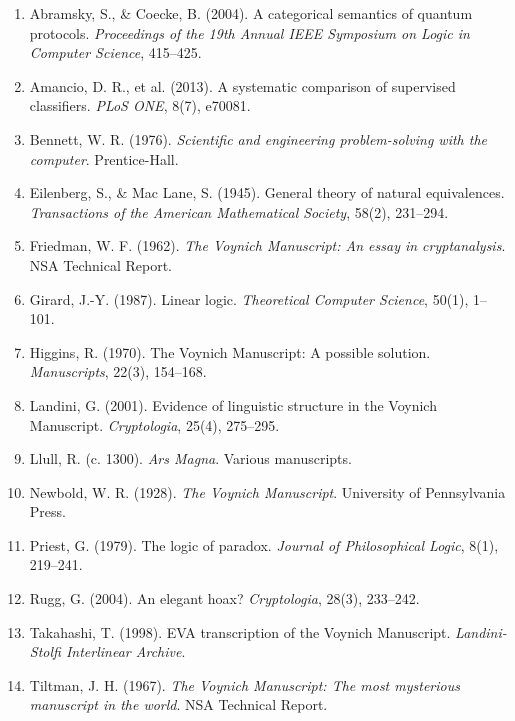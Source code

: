 \documentclass[12pt,a4paper]{article}
\begin{document}
\begin{enumerate}
    \item Abramsky, S., \& Coecke, B. (2004). A categorical semantics of quantum protocols. \emph{Proceedings of the 19th Annual IEEE Symposium on Logic in Computer Science}, 415--425.
    \item Amancio, D. R., et al. (2013). A systematic comparison of supervised classifiers. \emph{PLoS ONE}, 8(7), e70081.
    \item Bennett, W. R. (1976). \emph{Scientific and engineering problem-solving with the computer}. Prentice-Hall.
    \item Eilenberg, S., \& Mac Lane, S. (1945). General theory of natural equivalences. \emph{Transactions of the American Mathematical Society}, 58(2), 231--294.
    \item Friedman, W. F. (1962). \emph{The Voynich Manuscript: An essay in cryptanalysis}. NSA Technical Report.
    \item Girard, J.-Y. (1987). Linear logic. \emph{Theoretical Computer Science}, 50(1), 1--101.
    \item Higgins, R. (1970). The Voynich Manuscript: A possible solution. \emph{Manuscripts}, 22(3), 154--168.
    \item Landini, G. (2001). Evidence of linguistic structure in the Voynich Manuscript. \emph{Cryptologia}, 25(4), 275--295.
    \item Llull, R. (c. 1300). \emph{Ars Magna}. Various manuscripts.
    \item Newbold, W. R. (1928). \emph{The Voynich Manuscript}. University of Pennsylvania Press.
    \item Priest, G. (1979). The logic of paradox. \emph{Journal of Philosophical Logic}, 8(1), 219--241.
    \item Rugg, G. (2004). An elegant hoax? \emph{Cryptologia}, 28(3), 233--242.
    \item Takahashi, T. (1998). EVA transcription of the Voynich Manuscript. \emph{Landini-Stolfi Interlinear Archive}.
    \item Tiltman, J. H. (1967). \emph{The Voynich Manuscript: The most mysterious manuscript in the world}. NSA Technical Report.
\end{enumerate}
\end{document}

